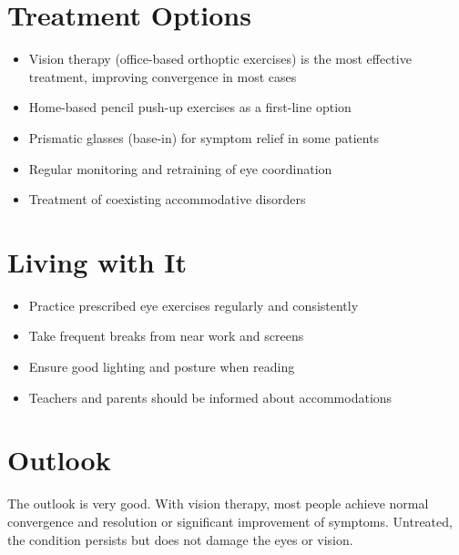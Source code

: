 \section{Treatment Options}
\begin{itemize}[noitemsep]
  \item Vision therapy (office-based orthoptic exercises) is the most effective treatment, improving convergence in most cases
  \item Home-based pencil push-up exercises as a first-line option
  \item Prismatic glasses (base-in) for symptom relief in some patients
  \item Regular monitoring and retraining of eye coordination
  \item Treatment of coexisting accommodative disorders
\end{itemize}
\section{Living with It}
\begin{itemize}[noitemsep]
  \item Practice prescribed eye exercises regularly and consistently
  \item Take frequent breaks from near work and screens
  \item Ensure good lighting and posture when reading
  \item Teachers and parents should be informed about accommodations
\end{itemize}
\section{Outlook}
The outlook is very good. With vision therapy, most people achieve normal convergence and resolution or significant improvement of symptoms. Untreated, the condition persists but does not damage the eyes or vision.
